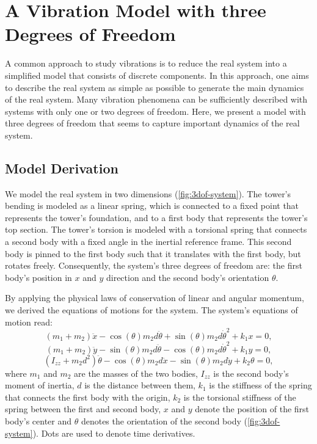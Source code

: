 \documentclass{article}
\begin{document}
\clearpage

\section{A Vibration Model with three Degrees of Freedom}
\label{sec:3dof}

A common approach to study vibrations is to reduce the real system into a simplified model that consists of discrete components. In this approach, one aims to describe the real system as simple as possible to generate the main dynamics of the real system. Many vibration phenomena can be sufficiently described with systems with only one or two degrees of freedom. Here, we present a model with three degrees of freedom that seems to capture important dynamics of the real system.
\par 

\subsection{Model Derivation}

We model the real system in two dimensions (\autoref{fig:3dof-system}). The tower's bending is modeled as a linear spring, which is connected to a fixed point that represents the tower's foundation, and to a first body that represents the tower's top section. The tower's torsion is modeled with a torsional spring that connects a second body with a fixed angle in the inertial reference frame. This second body is pinned to the first body such that it translates with the first body, but rotates freely. Consequently, the system's three degrees of freedom are: the first body's position in $x$ and $y$ direction and the second body's orientation $\theta$.
\par 
By applying the physical laws of conservation of linear and angular momentum, we derived the equations of motions for the system. The system's equations of motion read:
\begin{equation}
    (m_1 + m_2) \ddot{x} - \cos(\theta) m_2 d \ddot{\theta} + \sin(\theta) m_2 d \dot{\theta}^2 + k_1 x = 0,\label{eq:eom-x}
\end{equation}
\begin{equation}
    (m_1 + m_2) \ddot{y} - \sin(\theta) m_2 d \ddot{\theta} - \cos(\theta) m_2 d \dot{\theta}^2 + k_1 y = 0,\label{eq:eom-y}
\end{equation}
\begin{equation}
    (I_{zz} + m_2 d^2)\ddot{\theta} - \cos(\theta) m_2 d \ddot{x} - \sin(\theta)m_2 d \ddot{y} + k_2 \theta = 0,\label{eq:eom-theta}
\end{equation}
where $m_1$ and $m_2$ are the masses of the two bodies, $I_{zz}$ is the second body's moment of inertia, $d$ is the distance between them, $k_1$ is the stiffness of the spring that connects the first body with the origin, $k_2$ is the torsional stiffness of the spring between the first and second body, $x$ and $y$ denote the position of the first body's center and $\theta$ denotes the orientation of the second body (\autoref{fig:3dof-system}). Dots are used to denote time derivatives.
\end{document}
